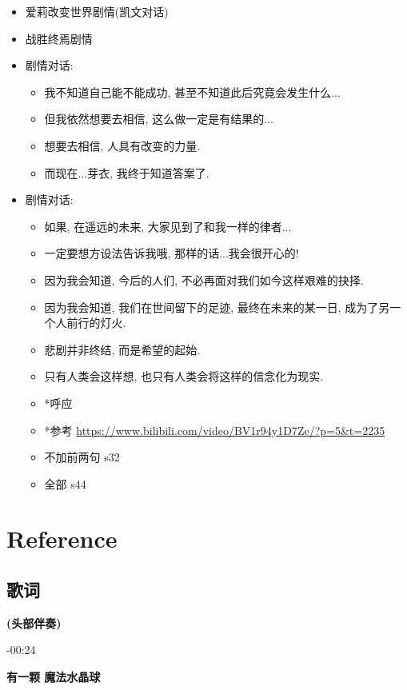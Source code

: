 \documentclass[a4paper]{article}
\begin{document}
\begin{itemize}
    \item 爱莉改变世界剧情(凯文对话)
    \item 战胜终焉剧情
    \item 剧情对话:
    \begin{itemize}
        \item 我不知道自己能不能成功, 甚至不知道此后究竟会发生什么...
        \item 但我依然想要去相信, 这么做一定是有结果的...
        \item 想要去相信, 人具有改变的力量.
        \item 而现在...芽衣, 我终于知道答案了.
    \end{itemize}
    \item 剧情对话:
    \begin{itemize}
        \item 如果, 在遥远的未来, 大家见到了和我一样的律者...
        \item 一定要想方设法告诉我哦, 那样的话...我会很开心的!
        \item 因为我会知道, 今后的人们, 不必再面对我们如今这样艰难的抉择.
        \item 因为我会知道, 我们在世间留下的足迹, 最终在未来的某一日, 成为了另一个人前行的灯火.
        \item 悲剧并非终结, 而是希望的起始.
        \item 只有人类会这样想, 也只有人类会将这样的信念化为现实.
        \item *呼应
        \item *参考 \url{https://www.bilibili.com/video/BV1r94y1D7Ze/?p=5&t=2235}
        \item 不加前两句 s32
        \item 全部 s44
    \end{itemize}
\end{itemize}

\section{Reference}

\subsection{歌词}

\textbf{(头部伴奏)}

-00:24

\textbf{有一颗 魔法水晶球}
\end{document}
